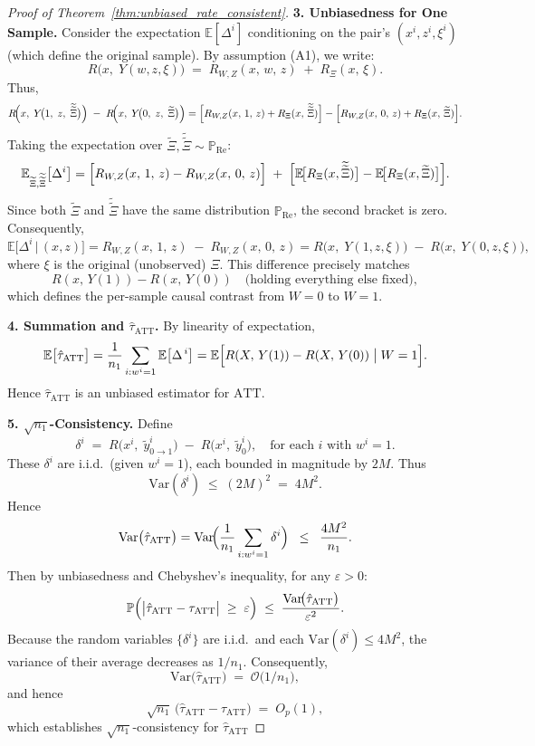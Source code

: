 \documentclass{article}
\theoremstyle{definition}
\begin{document}
\begin{proof}[Proof of Theorem~\ref{thm:unbiased_rate_consistent}]
\bigskip
\textbf{3. Unbiasedness for One Sample.}
Consider the expectation \(\mathbb{E}[\Delta^i]\) conditioning on the pair’s \((x^i,z^i,\xi^i)\) (which define the original sample). By assumption (A1), we write:
\[
R\!\bigl(x,\;Y(w,z,\xi)\bigr)
\;=\;
R_{W,Z}(x,\,w,\,z)
\;+\;
R_{\Xi}(x,\,\xi).
\]
Thus,
\[
R\!\Bigl(x,\;Y\!\bigl(1,\;z,\;\widetilde{\widetilde{\Xi}}\bigr)\Bigr)
\;-\;
R\!\Bigl(x,\;Y\!\bigl(0,\;z,\;\widetilde{\Xi}\bigr)\Bigr)
=
\Bigl[R_{W,Z}(x,\,1,\,z) + R_{\Xi}(x,\,\widetilde{\widetilde{\Xi}})\Bigr]
-
\Bigl[R_{W,Z}(x,\,0,\,z) + R_{\Xi}(x,\,\widetilde{\Xi})\Bigr].
\]
Taking the expectation over \(\widetilde{\Xi}, \widetilde{\widetilde{\Xi}}\sim \mathbb{P}_{\mathrm{Re}}\):
\[
\mathbb{E}_{\widetilde{\Xi},\widetilde{\widetilde{\Xi}}}\bigl[\Delta^i\bigr]
=
\Bigl[
R_{W,Z}(x,\,1,\,z) - R_{W,Z}(x,\,0,\,z)
\Bigr]
\;+\;
\Bigl[
\mathbb{E}\!\bigl[R_{\Xi}(x,\widetilde{\widetilde{\Xi}})\bigr]
- 
\mathbb{E}\!\bigl[R_{\Xi}(x,\widetilde{\Xi})\bigr]
\Bigr].
\]
Since both \(\widetilde{\Xi}\) and \(\widetilde{\widetilde{\Xi}}\) have the same distribution \(\mathbb{P}_{\mathrm{Re}}\), the second bracket is zero. Consequently,
\[
\mathbb{E}\bigl[\Delta^i \,\big|\,(x,z)\bigr]
=
R_{W,Z}(x,\,1,\,z) \;-\; R_{W,Z}(x,\,0,\,z)
=
R\!\bigl(x,\;Y(1,z,\xi)\bigr) \;-\; R\!\bigl(x,\;Y(0,z,\xi)\bigr),
\]
where \(\xi\) is the original (unobserved) \(\Xi\). This difference precisely matches
\[
R(x,\,Y(1)) - R(x,\,Y(0))
\quad
\text{(holding everything else fixed)},
\]
which defines the per-sample causal contrast from \(W=0\) to \(W=1\). 

\bigskip
\textbf{4. Summation and \(\hat{\tau}_{\text{ATT}}\).}
By linearity of expectation,
\[
\mathbb{E}\bigl[\hat{\tau}_{\text{ATT}}\bigr]
=
\frac{1}{n_1}\sum_{i: w^i=1}
\mathbb{E}\bigl[\Delta^{\,i}\bigr]
=
\mathbb{E}\Bigl[
R(X,\,Y(1)) - R(X,\,Y(0)) \;\big|\; W=1
\Bigr].
\]
Hence \(\hat{\tau}_{\text{ATT}}\) is an unbiased estimator for \(\text{ATT}\).

\bigskip
\textbf{5. $\sqrt{n_1}$-Consistency.}
Define 
\[
\delta^i \;=\; R\bigl(x^i,\;\tilde{y}^{i}_{0\to1}\bigr) \;-\; R\bigl(x^i,\;\tilde{y}^{i}_{0}\bigr), \quad \text{for each }i\text{ with }w^i=1.
\]
These $\delta^i$ are i.i.d.\ (given $w^i=1$), each bounded in magnitude by $2M$. Thus
\[
\mathrm{Var}(\delta^i) \;\le\; (2M)^2 \;=\; 4M^2.
\]
Hence
\[
\mathrm{Var}\bigl(\hat{\tau}_{\text{ATT}}\bigr) = \mathrm{Var}\!\Bigl(\frac{1}{n_1}\sum_{i: w^i=1}\delta^i\Bigr) \;\;\le\;\; \frac{4M^2}{n_1}.
\]
Then by unbiasedness and Chebyshev's inequality, for any $\varepsilon>0$:
\[
\mathbb{P}\Bigl(\bigl|\hat{\tau}_{\text{ATT}} - \tau_{\text{ATT}}\bigr|\;\ge\;\varepsilon\Bigr) \;\le\; \frac{\mathrm{Var}\!\bigl(\hat{\tau}_{\text{ATT}}\bigr)}{\varepsilon^2}.
\]
Because the random variables $\{\delta^{i}\}$ are i.i.d.\ and each $\mathrm{Var}(\delta^{i})\le4M^2$, the variance of their average decreases as $1/n_1$. Consequently,
\[
\mathrm{Var}\bigl(\hat{\tau}_{\text{ATT}}\bigr)\;=\;\mathcal{O}\!\bigl(1/n_1\bigr),
\]
and hence 
\[
\sqrt{n_1}\,\bigl(\hat{\tau}_{\text{ATT}} - \tau_{\text{ATT}}\bigr) \;=\; O_{p}(1),
\]
which establishes $\sqrt{n_1}$-consistency for $\hat{\tau}_{\text{ATT}}$


\end{proof}
\end{document}

